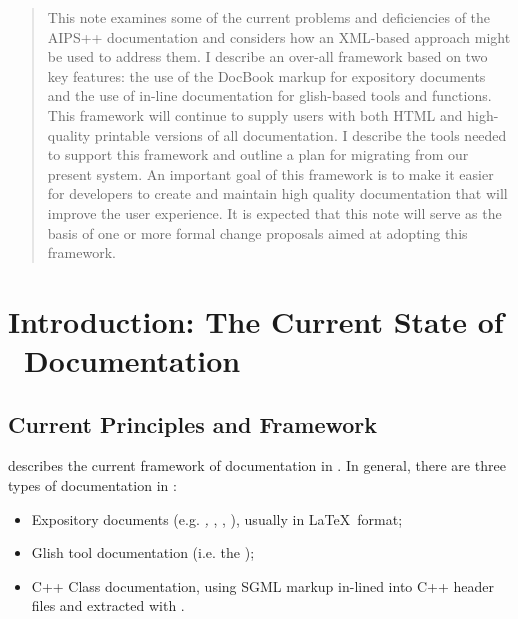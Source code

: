 \newcommand{\refman}{{\it Reference Manual}}

\begin{abstract}
This note examines some of the current problems and deficiencies of
the AIPS++ documentation and considers how an XML-based approach might
be used to address them.  I describe an over-all framework based on
two key features: the use of the DocBook markup for expository
documents and the use of in-line documentation for glish-based tools
and functions.  This framework will continue to supply users with both
HTML and high-quality printable versions of all documentation.  I
describe the tools needed to support this framework and outline a plan
for migrating from our present system.  An important goal of this
framework is to make it easier for developers to create and maintain
high quality documentation that will improve the user experience.  It
is expected that this note will serve as the basis of one or more
formal change proposals aimed at adopting this framework.
\end{abstract}

\tableofcontents

\section{Introduction:  The Current State of \aipspp\ Documentation}

\subsection{Current Principles and Framework}

 describes the
current framework of documentation in \aipspp.  In general, there are
three types of documentation in \aipspp:

\begin{itemize}
\item Expository documents (e.g. {\it 
{},
},
, 
), usually in \LaTeX\ 
format;

\item Glish tool documentation (i.e. the {\it
{}});

\item C++ Class documentation, using SGML markup in-lined into C++
header files and extracted with 
.

\end{itemize}

